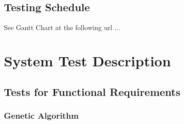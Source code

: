 \documentclass[12pt, titlepage]{article}
\begin{document}
\subsection{Testing Schedule}
		
See Gantt Chart at the following url ...

\section{System Test Description}
	
\subsection{Tests for Functional Requirements}

\subsubsection{Genetic Algorithm}
\end{document}

